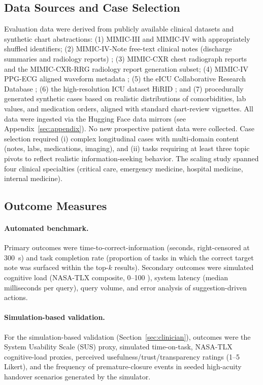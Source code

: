 \documentclass[11pt]{article}
\begin{document}
\subsection{Data Sources and Case Selection}
\label{sec:data}

Evaluation data were derived from publicly available clinical datasets and synthetic chart abstractions: (1) MIMIC-III \citep{johnson2016_mimic3} and MIMIC-IV \citep{pollard2018_mimic4} with appropriately shuffled identifiers; (2) MIMIC-IV-Note free-text clinical notes (discharge summaries and radiology reports) \citep{johnson2023_mimiciv_note}; (3) MIMIC-CXR chest radiograph reports \citep{johnson2019_mimic_cxr} and the MIMIC-CXR-RRG radiology report generation subset; (4) MIMIC-IV PPG-ECG aligned waveform metadata \citep{moody2022_mimic4wdb}; (5) the eICU Collaborative Research Database \citep{pollard2018_eicu}; (6) the high-resolution ICU dataset HiRID \citep{muller2021_hirid}; and (7) procedurally generated synthetic cases based on realistic distributions of comorbidities, lab values, and medication orders, aligned with standard chart-review vignettes. All data were ingested via the Hugging Face data mirrors (see Appendix~\ref{sec:appendix}). No new prospective patient data were collected. Case selection required (i) complex longitudinal cases with multi-domain content (notes, labs, medications, imaging), and (ii) tasks requiring at least three topic pivots to reflect realistic information-seeking behavior. The scaling study spanned four clinical specialties (critical care, emergency medicine, hospital medicine, internal medicine).

\subsection{Outcome Measures}
\label{sec:outcomes}

\paragraph{Automated benchmark.} Primary outcomes were time-to-correct-information (seconds, right-censored at 300~s) and task completion rate (proportion of tasks in which the correct target note was surfaced within the top-$k$ results). Secondary outcomes were simulated cognitive load (NASA-TLX composite, 0--100 \citep{hart1988}), system latency (median milliseconds per query), query volume, and error analysis of suggestion-driven actions.

\paragraph{Simulation-based validation.} For the simulation-based validation (Section~\ref{sec:clinician}), outcomes were the System Usability Scale (SUS) proxy, simulated time-on-task, NASA-TLX cognitive-load proxies, perceived usefulness/trust/transparency ratings (1--5 Likert), and the frequency of premature-closure events in seeded high-acuity handover scenarios generated by the simulator.
\end{document}
